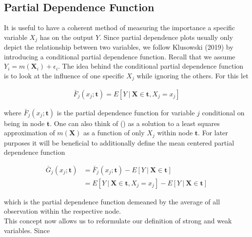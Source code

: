 \par{

\subsection{Partial Dependence Function}

It is useful to have a coherent method of measuring the importance a specific variable $X_j$ has on the output $Y$. 
Since partial dependence plots usually only depict the relationship between two variables, we follow Klusowski (2019) by introducing a conditional partial dependence function. 
Recall that we assume $Y_i = m(\mathbf{X}_i) + \epsilon_i$. 
The idea behind the conditional partial dependence function is to look at the influence of one specific $X_j$ while ignoring the others. 
For this let 

\begin{align}
    \bar{F}_j(x_j; \mathbf{t}) = E [Y \ | \ \mathbf{X} \in \mathbf{t}, X_j = x_j] \label{pardepfunc_f}
\end{align}

where $\bar{F}_j(x_j; \mathbf{t})$ is the partial dependence function for variable $j$ conditional on being in node $\mathbf{t}$. 
One can also think of () as a solution to a least squares approximation of $m(\mathbf{X})$ as a function of only $X_j$ within node $\mathbf{t}$.
For later purposes it will be beneficial to additionally define the mean centered partial dependence function 

\begin{align}
    \bar{G}_j(x_j; \mathbf{t}) &= \bar{F}_j(x_j; \mathbf{t}) - E [Y \ | \ \mathbf{X} \in \mathbf{t}] \nonumber \\
    &= E [Y \ | \ \mathbf{X} \in \mathbf{t}, X_j = x_j] - E [Y \ | \ \mathbf{X} \in \mathbf{t}] \label{pardepfunc_g}
\end{align}

which is the partial dependence function demeaned by the average of all observation within the respective node. \\

This concept now allows us to reformulate our definition of strong and weak variables. Since 
}